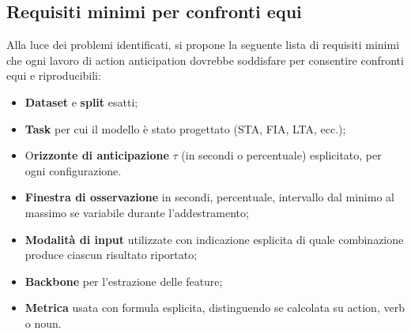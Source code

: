 \subsection{Requisiti minimi per confronti equi}
Alla luce dei problemi identificati, si propone la seguente lista di requisiti minimi che ogni lavoro di action anticipation dovrebbe soddisfare per consentire confronti equi e riproducibili:
\begin{itemize}
    \item \textbf{Dataset} e \textbf{split} esatti;
    \item \textbf{Task} per cui il modello è stato progettato (STA, FIA, LTA, ecc.);
    \item O\textbf{rizzonte di anticipazione} $\tau$ (in secondi o percentuale) esplicitato, per ogni configurazione.
    \item \textbf{Finestra di osservazione} in secondi, percentuale, intervallo dal minimo al massimo se variabile durante l'addestramento;
    \item \textbf{Modalità di input} utilizzate con indicazione esplicita di quale combinazione produce ciascun risultato riportato;
    \item \textbf{Backbone} per l’estrazione delle feature;
    \item \textbf{Metrica} usata con formula esplicita, distinguendo se calcolata su action, verb o noun.
\end{itemize}

